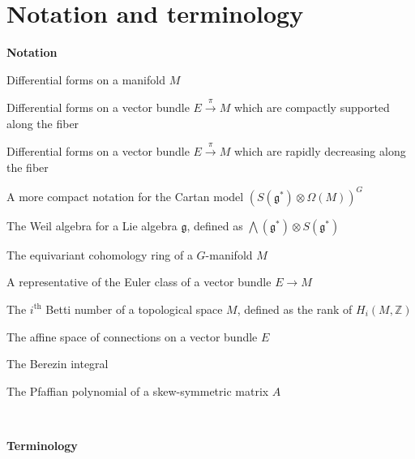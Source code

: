 

\chapter{Notation and terminology}\label{notation}

\renewcommand{\thefootnote}{\fnsymbol{footnote}}


\noindent\textbf{Notation}


\newcommand{\nttn}[2]{\item[{\ \parbox{3.18cm}{#1}}]{#2}}
\begin{list}{}{ \setlength{\leftmargin}{3.4cm}
                \setlength{\labelwidth}{3.4cm}}

\nttn{$\Omega(M)$}{Differential forms on a manifold $M$}

\nttn{$\Omega_{cv}(E)$}{Differential forms on a vector bundle
	$E\xrightarrow{\pi} M$ which are compactly supported along the fiber}

\nttn{$\Omega_{rd}(E)$}{Differential forms on a vector bundle
	$E\xrightarrow{\pi} M$ which are rapidly decreasing along the fiber}

\nttn{$\Omega_G(M)$}{A more compact notation for the Cartan model
$(S(\mathfrak{g}^*)\otimes \Omega(M))^G$}

\nttn{$W(\mathfrak{g})$}{The Weil algebra for a Lie algebra $\mathfrak{g}$,
defined as $\bigwedge (\mathfrak{g}^*) \otimes S(\mathfrak{g}^*)$}

\nttn{$H_G(M)$}{The equivariant cohomology ring of a $G$-manifold  $M$}

\nttn{$\chi(E\to M)$ \\or $\chi(E)$}{A representative of the Euler class of a vector bundle
$E\to M$}


\nttn{$b_i$}{The $i^{\text{th}}$ Betti number of a topological space $M$, defined as
the rank of $H_i(M,\mathbb{Z})$}

\nttn{$\mathcal{A}(E)$}{The affine space of connections on a vector bundle $E$}


\nttn{$\int^B$}{The Berezin integral}


\nttn{$\Pf(A)$}{The Pfaffian polynomial of a skew-symmetric matrix $A$}

\end{list}

\

\noindent\textbf{Terminology}

